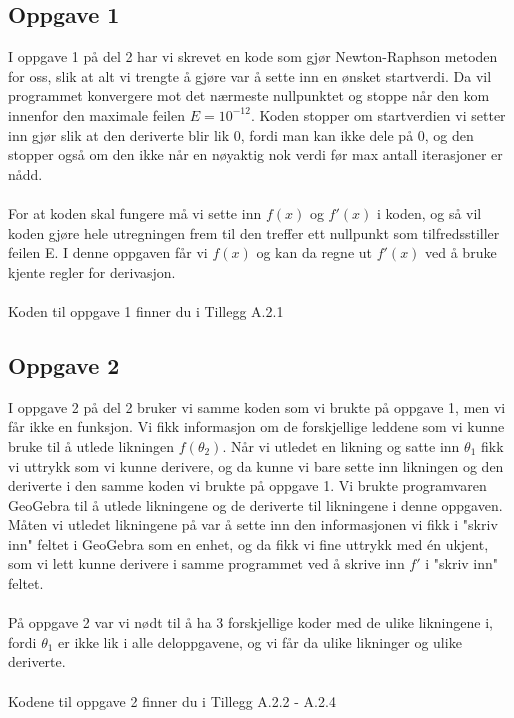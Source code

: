 \subsection{Oppgave 1}
I oppgave 1 på del 2 har vi skrevet en kode som gjør Newton-Raphson metoden for oss, slik at alt vi trengte å gjøre var å sette inn en ønsket startverdi. Da vil programmet konvergere mot det nærmeste nullpunktet og stoppe når den kom innenfor den maximale feilen $E = 10^{-12}$. Koden stopper om startverdien vi setter inn gjør slik at den deriverte blir lik 0, fordi man kan ikke dele på 0, og den stopper også om den ikke når en nøyaktig nok verdi før max antall iterasjoner er nådd.
\\
\\
For at koden skal fungere må vi sette inn $f(x)$ og $f'(x)$ i koden, og så vil koden gjøre hele utregningen frem til den treffer ett nullpunkt som tilfredsstiller feilen E. I denne oppgaven får vi $f(x)$ og kan da regne ut $f'(x)$ ved å bruke kjente regler for derivasjon.
\\
\\
Koden til oppgave 1 finner du i Tillegg A.2.1


\subsection{Oppgave 2}
I oppgave 2 på del 2 bruker vi samme koden som vi brukte på oppgave 1, men vi får ikke en funksjon. Vi fikk informasjon om de forskjellige leddene som vi kunne bruke til å utlede likningen $f(\theta_2)$. Når vi utledet en likning og satte inn \(\theta_1\) fikk vi uttrykk som vi kunne derivere, og da kunne vi bare sette inn likningen og den deriverte i den samme koden vi brukte på oppgave 1. Vi brukte programvaren GeoGebra til å utlede likningene og de deriverte til likningene i denne oppgaven. Måten vi utledet likningene på var å sette inn den informasjonen vi fikk i "skriv inn" feltet i GeoGebra som en enhet, og da fikk vi fine uttrykk med én ukjent, som vi lett kunne derivere i samme programmet ved å skrive inn $f'$ i "skriv inn" feltet. 
\\
\\
På oppgave 2 var vi nødt til å ha 3 forskjellige koder med de ulike likningene i, fordi \(\theta_1\) er ikke lik i alle deloppgavene, og vi får da ulike likninger og ulike deriverte. 
\\
\\
Kodene til oppgave 2 finner du i Tillegg A.2.2 - A.2.4